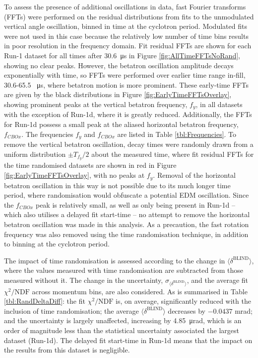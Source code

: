 To assess the presence of additional oscillations in data, fast Fourier transforms (FFTs) were performed on the residual distributions from fits to the unmodulated vertical angle oscillation, binned in time at the cyclotron period. Modulated fits were not used in this case because the relatively low number of time bins results in poor resolution in the frequency domain. Fit residual FFTs are shown for each Run-1 dataset for all times after \SI{30.6}{\micro\second} in Figure \ref{fig:AllTimeFFTsNoRand}, showing no clear peaks. However, the betatron oscillation amplitude decays exponentially with time, so FFTs were performed over earlier time range in-fill, 30.6-65.5 \SI{}{\micro\second}, where betatron motion is more prominent. These early-time FFTs are given by the black distributions in Figure \ref{fig:EarlyTimeFFTsOverlay}, showing prominent peaks at the vertical betatron frequency, $f_{y}$, in all datasets with the exception of Run-1d, where it is greatly reduced. Additionally, the FFTs for Run-1d possess a small peak at the aliased horizontal betatron frequency, $f_{CBOx}$. The frequencies $f_{y}$ and $f_{CBOx}$ are listed in Table \ref{tbl:Frequencies}. To remove the vertical betatron oscillation, decay times were randomly drawn from a uniform distribution $\pm T_{f_{y}}/2$ about the measured time, where fit residual FFTs for the time randomised datasets are shown in red in Figure \ref{fig:EarlyTimeFFTsOverlay}, with no peaks at $f_{y}$. Removal of the horizontal betatron oscillation in this way is not possible due to its much longer time period, where randomisation would obfuscate a potential EDM oscillation. Since the $f_{CBOx}$ peak is relatively small, as well as only being present in Run-1d -- which also utilises a delayed fit start-time -- no attempt to remove the horizontal betatron oscillation was made in this analysis. As a precaution, the fast rotation frequency was also removed using the time randomisation technique, in addition to binning at the cyclotron period. 

The impact of time randomisation is assessed according to the change in $\langle \delta^{\text{BLIND}} \rangle$, where the values measured with time randomisation are subtracted from those measured without it. The change in the uncertainty, $\sigma_{\langle \delta^{\text{BLIND}} \rangle}$, and the average fit $\chi^{2}/\text{NDF}$ across momentum bins, are also considered. As is summarised in Table \ref{tbl:RandDeltaDiff}: the fit $\chi^{2}/\text{NDF}$ is, on average, significantly reduced with the inclusion of time randomisation; the average $\langle \delta^{\text{BLIND}} \rangle$ decreases by $-0.0437$ mrad; and the uncertainty is largely unaffected, increasing by \SI{4.85}{\micro\radian}, which is an order of magnitude less than the statistical uncertainty associated the largest dataset (Run-1d). The delayed fit start-time in Run-1d means that the impact on the results from this dataset is negligible. 

